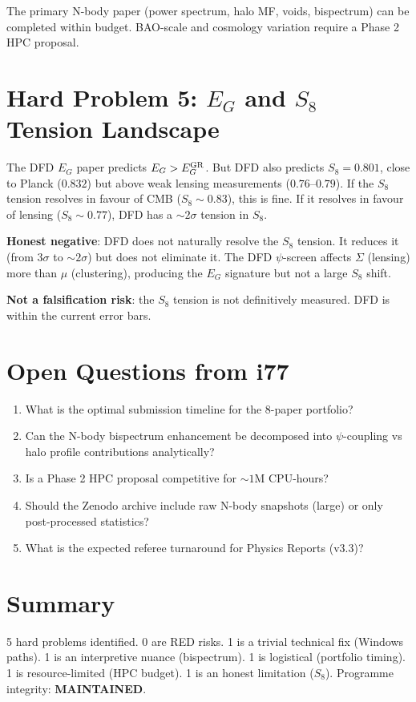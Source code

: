 \documentclass[11pt,a4paper]{article}
\begin{document}
The primary N-body paper (power spectrum, halo MF, voids, bispectrum) can be completed within budget. BAO-scale and cosmology variation require a Phase 2 HPC proposal.

\section{Hard Problem 5: $E_G$ and $S_8$ Tension Landscape}

The DFD $E_G$ paper predicts $E_G > E_G^{\rm GR}$. But DFD also predicts $S_8 = 0.801$, close to Planck ($0.832$) but above weak lensing measurements ($0.76$--$0.79$). If the $S_8$ tension resolves in favour of CMB ($S_8 \sim 0.83$), this is fine. If it resolves in favour of lensing ($S_8 \sim 0.77$), DFD has a $\sim 2\sigma$ tension in $S_8$.

\textbf{Honest negative}: DFD does not naturally resolve the $S_8$ tension. It reduces it (from $3\sigma$ to $\sim 2\sigma$) but does not eliminate it. The DFD $\psi$-screen affects $\Sigma$ (lensing) more than $\mu$ (clustering), producing the $E_G$ signature but not a large $S_8$ shift.

\textbf{Not a falsification risk}: the $S_8$ tension is not definitively measured. DFD is within the current error bars.

\section{Open Questions from i77}

\begin{enumerate}[nosep]
\item What is the optimal submission timeline for the 8-paper portfolio?
\item Can the N-body bispectrum enhancement be decomposed into $\psi$-coupling vs halo profile contributions analytically?
\item Is a Phase 2 HPC proposal competitive for $\sim 1$M CPU-hours?
\item Should the Zenodo archive include raw N-body snapshots (large) or only post-processed statistics?
\item What is the expected referee turnaround for Physics Reports (v3.3)?
\end{enumerate}

\section{Summary}

5 hard problems identified. 0 are RED risks. 1 is a trivial technical fix (Windows paths). 1 is an interpretive nuance (bispectrum). 1 is logistical (portfolio timing). 1 is resource-limited (HPC budget). 1 is an honest limitation ($S_8$). Programme integrity: \textbf{MAINTAINED}.
\end{document}
